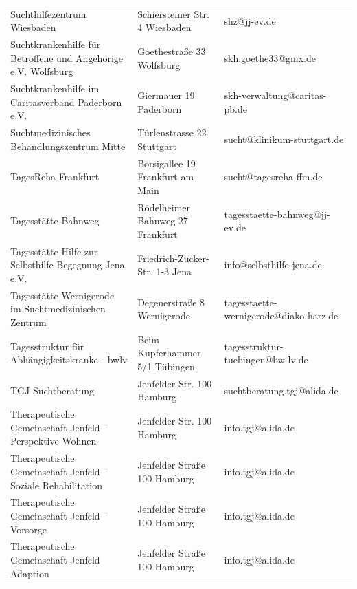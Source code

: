 {\begin{xltabular}{\textwidth} {
 >{\raggedright\arraybackslash}p{5cm}
 >{\raggedright\arraybackslash}X
 >{\raggedright\arraybackslash}p{5cm} }
Suchthilfezentrum Wiesbaden & Schiersteiner Str. 4 Wiesbaden & shz@jj-ev.de \\
Suchtkrankenhilfe für Betroffene und Angehörige e.V. Wolfsburg & Goethestraße 33 Wolfsburg & skh.goethe33@gmx.de \\
Suchtkrankenhilfe im Caritasverband Paderborn e.V. & Giermauer 19 Paderborn & skh-verwaltung@caritas-pb.de \\
Suchtmedizinisches Behandlungszentrum Mitte & Türlenstrasse 22 Stuttgart & sucht@klinikum-stuttgart.de \\
TagesReha Frankfurt & Borsigallee 19 Frankfurt am Main & sucht@tagesreha-ffm.de \\
Tagesstätte Bahnweg & Rödelheimer Bahnweg 27 Frankfurt & tagesstaette-bahnweg@jj-ev.de \\
Tagesstätte Hilfe zur Selbsthilfe Begegnung Jena e.V. & Friedrich-Zucker-Str. 1-3 Jena & info@selbsthilfe-jena.de \\
Tagesstätte Wernigerode im Suchtmedizinischen Zentrum & Degenerstraße 8 Wernigerode & tagesstaette-wernigerode@diako-harz.de \\
Tagesstruktur für Abhängigkeitskranke - bwlv & Beim Kupferhammer 5/1 Tübingen & tagesstruktur-tuebingen@bw-lv.de \\
TGJ Suchtberatung & Jenfelder Str. 100 Hamburg & suchtberatung.tgj@alida.de \\
Therapeutische Gemeinschaft Jenfeld - Perspektive Wohnen & Jenfelder Str. 100 Hamburg & info.tgj@alida.de \\
Therapeutische Gemeinschaft Jenfeld - Soziale Rehabilitation & Jenfelder Straße 100 Hamburg & info.tgj@alida.de \\
Therapeutische Gemeinschaft Jenfeld - Vorsorge & Jenfelder Straße 100 Hamburg & info.tgj@alida.de \\
Therapeutische Gemeinschaft Jenfeld Adaption & Jenfelder Straße 100 Hamburg & info.tgj@alida.de \\

\end{xltabular}}
